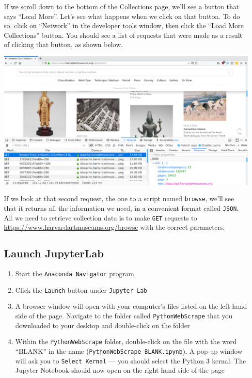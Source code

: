 \documentclass[
]{book}
\providecommand{\tightlist}{%
  \setlength{\itemsep}{0pt}\setlength{\parskip}{0pt}}
\begin{document}
If we scroll down to the bottom of the Collections page, we'll see a button that says ``Load More''. Let's see what happens when we click on that button. To do so, click on ``Network'' in the developer tools window, then click the ``Load More Collections'' button. You should see a list of requests that were made as a result of clicking that button, as shown below.

\includegraphics{Python/PythonWebScrape/images/dev_tools_network.png}

If we look at that second request, the one to a script named \texttt{browse}, we'll see that it returns all the information we need, in a convenient format called \texttt{JSON}. All we need to retrieve collection data is to make \texttt{GET} requests to \url{https://www.harvardartmuseums.org/browse} with the correct parameters.

\hypertarget{launch-jupyterlab-2}{%
\subsection{Launch JupyterLab}\label{launch-jupyterlab-2}}

\begin{enumerate}
\def\labelenumi{\arabic{enumi}.}
\tightlist
\item
  Start the \texttt{Anaconda\ Navigator} program
\item
  Click the \texttt{Launch} button under \texttt{Jupyter\ Lab}
\item
  A browser window will open with your computer's files listed on the left hand side of the page. Navigate to the folder called \texttt{PythonWebScrape} that you downloaded to your desktop and double-click on the folder
\item
  Within the \texttt{PythonWebScrape} folder, double-click on the file with the word ``BLANK'' in the name (\texttt{PythonWebScrape\_BLANK.ipynb}). A pop-up window will ask you to \texttt{Select\ Kernal} --- you should select the Python 3 kernal. The Jupyter Notebook should now open on the right hand side of the page
\end{enumerate}
\end{document}
